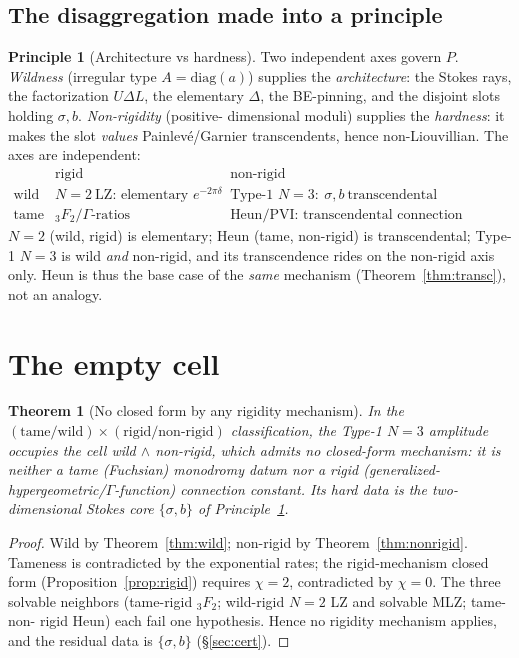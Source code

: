 \documentclass[11pt]{article}
\newtheorem{theorem}{Theorem}
\theoremstyle{definition}
\newtheorem{principle}{Principle}
\theoremstyle{remark}
\newcommand{\diag}{\mathrm{diag}}
\begin{document}
\subsection{The disaggregation made into a principle}

\begin{principle}[Architecture vs hardness]\label{prin:disagg}
Two independent axes govern $P$. \emph{Wildness} (irregular type $A=\diag(a)$) supplies the
\emph{architecture}: the Stokes rays, the factorization $U\Delta L$, the elementary $\Delta$,
the BE-pinning, and the disjoint slots holding $\sigma,b$. \emph{Non-rigidity} (positive-%
dimensional moduli) supplies the \emph{hardness}: it makes the slot \emph{values}
Painlev\'e/Garnier transcendents, hence non-Liouvillian. The axes are independent:
\[
\begin{array}{c|cc}
 & \text{rigid} & \text{non-rigid}\\\hline
\text{wild} & N{=}2\ \text{LZ: elementary }e^{-2\pi\delta} & \boxed{\text{Type-1 }N{=}3:\ \sigma,b\ \text{transcendental}}\\
\text{tame} & {}_3F_2/\Gamma\text{-ratios} & \text{Heun/PVI: transcendental connection constant}
\end{array}
\]
$N{=}2$ (wild, rigid) is elementary; Heun (tame, non-rigid) is transcendental; Type-1 $N{=}3$
is wild \emph{and} non-rigid, and its transcendence rides on the non-rigid axis only. Heun is
thus the base case of the \emph{same} mechanism (Theorem~\ref{thm:transc}), not an analogy.
\end{principle}

\section{The empty cell}\label{sec:empty}

\begin{theorem}[No closed form by any rigidity mechanism]\label{thm:empty}
In the $(\text{tame/wild})\times(\text{rigid/non-rigid})$ classification, the Type-1 $N{=}3$
amplitude occupies the cell \emph{wild $\wedge$ non-rigid}, which admits no closed-form
mechanism: it is neither a tame (Fuchsian) monodromy datum nor a rigid (generalized-%
hypergeometric/$\Gamma$-function) connection constant. Its hard data is the
two-dimensional Stokes core $\{\sigma,b\}$ of Principle~\ref{prin:disagg}.
\end{theorem}

\begin{proof}
Wild by Theorem~\ref{thm:wild}; non-rigid by Theorem~\ref{thm:nonrigid}. Tameness is
contradicted by the exponential rates; the rigid-mechanism closed form
(Proposition~\ref{prop:rigid}) requires $\chi=2$, contradicted by $\chi=0$. The three
solvable neighbors (tame-rigid ${}_3F_2$; wild-rigid $N{=}2$ LZ and solvable MLZ; tame-non-%
rigid Heun) each fail one hypothesis. Hence no rigidity mechanism applies, and the residual
data is $\{\sigma,b\}$ (\S\ref{sec:cert}).
\end{proof}
\end{document}

